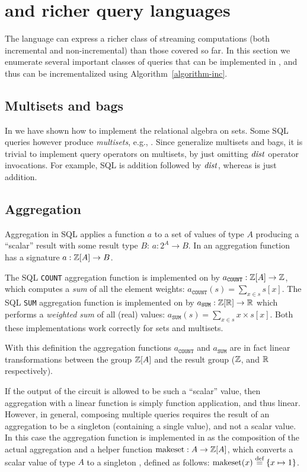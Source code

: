 \section{\dbsp and richer query languages}\label{sec:extensions}

The \dbsp language can express a richer class of streaming computations (both incremental and non-incremental)
than those covered so far. In this section we enumerate several important classes of
queries that can be implemented in \dbsp, and thus can be incrementalized using Algorithm~\ref{algorithm-inc}.

\subsection{Multisets and bags}

In  we have shown how to implement the relational algebra on sets.
Some SQL queries however produce \emph{multisets}, e.g., .
Since \zrs generalize multisets and bags, it is trivial to implement query
operators on multisets, by just omitting $\mathit{dist}$ operator invocations.
For example, SQL  is \zr addition followed by $\mathit{dist}$,
whereas  is just \zr addition.

\subsection{Aggregation}\label{sec:aggregation}

Aggregation in SQL applies a function $a$ to a set of values of type $A$ producing a ``scalar''
result with some result type $B$: $a: 2^A \to B$.  In \dbsp an aggregation function has
a signature $a: \mathbb{Z}[A] \to B$.

The SQL \texttt{COUNT} aggregation function is implemented on \zrs by $a_\texttt{COUNT} : \mathbb{Z}[A] \to \mathbb{Z}$, which
computes a \emph{sum} of all the element weights: $a_\texttt{COUNT}(s) = \sum_{x \in s} s[x]$.
The SQL \texttt{SUM} aggregation function is implemented on \zrs by $a_\texttt{SUM}: \mathbb{Z}[\mathbb{R}] \to \mathbb{R}$ which
performs a \emph{weighted sum} of all (real) values: $a_\texttt{SUM}(s) = \sum_{x \in s} x \times s[x]$.
Both these implementations work correctly for sets and multisets.

With this definition the aggregation functions $a_\texttt{COUNT}$ and $a_\texttt{SUM}$ are in
fact linear transformations between the group $\mathbb{Z}[A]$ and the result group ($\mathbb{Z}$, and $\mathbb{R}$ respectively).

If the output of the \dbsp circuit is allowed to be such a ``scalar'' value, then aggregation
with a linear function is simply function application, and thus linear.
However, in general, composing multiple queries
requires the result of an aggregation to be a singleton \zr (containing a single value),
and not a scalar value.  In this case the aggregation function is implemented in
\dbsp as the composition of the actual aggregation and a helper function
$\mbox{makeset}: A \to \mathbb{Z}[A]$,
which converts a scalar value of type $A$ to a singleton \zr, defined as follows:
$\mbox{makeset}(x) \stackrel{\textrm{\scriptsize def}}{=} \{ x \mapsto 1 \}$.

